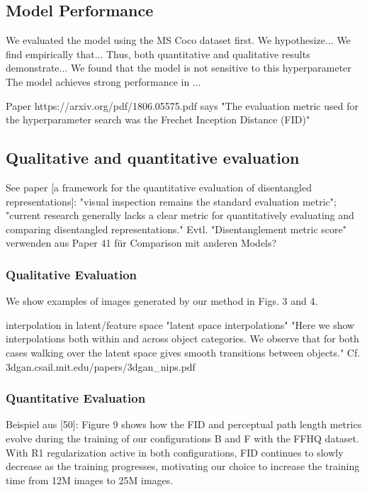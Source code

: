 \documentclass[12pt,a4paper]{article}
\begin{document}
\subsection{Model Performance}
We evaluated the model using the MS Coco dataset first.
We hypothesize...
We find empirically that...
Thus, both quantitative and qualitative results demonstrate...
We found that the model is not sensitive to this hyperparameter
The model achieves strong performance in ...

\par Paper https://arxiv.org/pdf/1806.05575.pdf says "The evaluation metric used for the hyperparameter search was the Frechet Inception Distance (FID)"

\subsection{Qualitative and quantitative evaluation}
See paper [a framework for the quantitative evaluation of disentangled representations]: "visual inspection remains the standard evaluation metric"; "current research generally lacks a clear metric for quantitatively evaluating and comparing disentangled representations."
Evtl. "Disentanglement metric score" verwenden aus Paper 41 für Comparison mit anderen Models?

\subsubsection{Qualitative Evaluation}
We show examples of images generated by our method in Figs. 3 and 4.

interpolation in latent/feature space
"latent space interpolations"
"Here we show interpolations both within and across object categories. We observe that for both cases walking over the latent space gives smooth transitions between objects." Cf. 3dgan.csail.mit.edu/papers/3dgan\_nips.pdf

\subsubsection{Quantitative Evaluation}
Beispiel aus [50]: Figure 9 shows how the FID and perceptual path length metrics evolve during the training of our configurations B and F with the FFHQ dataset. With R1 regularization active in both configurations, FID continues to slowly decrease as the training progresses, motivating our choice to increase the training time from 12M images to 25M images.
\end{document}
